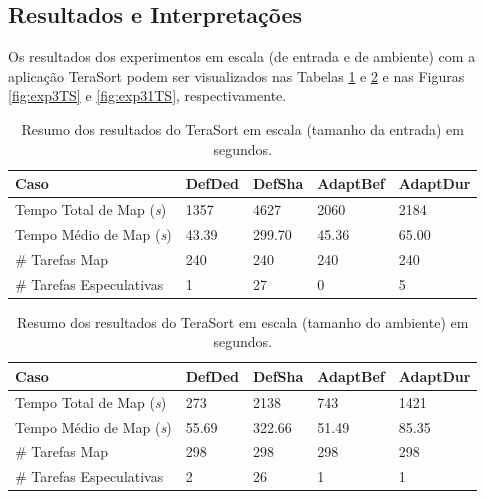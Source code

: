 \subsection{Resultados e Interpretações}
Os resultados dos experimentos em escala (de entrada e de ambiente) com a aplicação TeraSort podem ser visualizados nas Tabelas \ref{tab:exp3TS} e \ref{tab:exp31TS} e nas Figuras \ref{fig:exp3TS} e \ref{fig:exp31TS}, respectivamente.

\begin{table}[!ht]
	\caption{Resumo dos resultados do TeraSort em escala (tamanho da entrada) em segundos.} \label{tab:exp3TS}
	\begin{tabular*}{\hsize}{l|llll}
		\textbf{Caso} & \textbf{DefDed} & \textbf{DefSha} & \textbf{AdaptBef} & \textbf{AdaptDur}\\
		\hline
		Tempo Total de Map ({\it{s}}) & 1357 & 4627 & 2060 & 2184 \\
		Tempo Médio de Map ({\it{s}}) & 43.39 & 299.70 & 45.36 & 65.00 \\
		\# Tarefas Map & 240 & 240 & 240 & 240 \\
		\# Tarefas Especulativas & 1 & 27 & 0 & 5 \\
	\end{tabular*}
\end{table}
%
%


\begin{table}[!ht]
	\caption{Resumo dos resultados do TeraSort em escala (tamanho do ambiente) em segundos.} \label{tab:exp31TS}
	\begin{tabular*}{\hsize}{l|llll}
		\textbf{Caso} & \textbf{DefDed} & \textbf{DefSha} & \textbf{AdaptBef} & \textbf{AdaptDur}\\
		\hline
		Tempo Total de Map ({\it{s}}) & 273 & 2138 & 743 & 1421 \\
		Tempo Médio de Map ({\it{s}}) & 55.69 & 322.66 & 51.49 & 85.35 \\
		\# Tarefas Map & 298 & 298 & 298 & 298 \\
		\# Tarefas Especulativas & 2 & 26 & 1 & 1 \\
	\end{tabular*}
\end{table}
%
%

